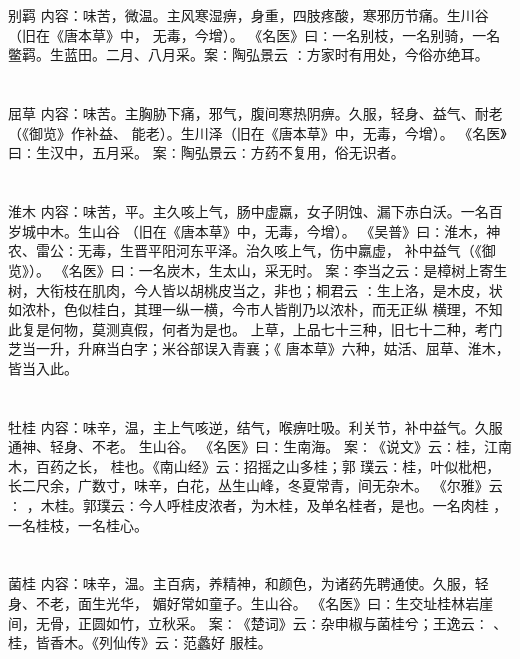 \documentclass[12pt,UTF8]{ctexbook}
\begin{document}
\section{}别羁
内容：味苦，微温。主风寒湿痹，身重，四肢疼酸，寒邪历节痛。生川谷（旧在《唐本草》中， 
无毒，今增）。 
《名医》曰∶一名别枝，一名别骑，一名鳖羁。生蓝田。二月、八月采。案∶陶弘景云 
∶方家时有用处，今俗亦绝耳。 


\section{}屈草
内容：味苦。主胸胁下痛，邪气，腹间寒热阴痹。久服，轻身、益气、耐老（《御览》作补益、 
能老）。生川泽（旧在《唐本草》中，无毒，今增）。 
《名医》曰∶生汉中，五月采。 
案∶陶弘景云∶方药不复用，俗无识者。 


\section{}淮木
内容：味苦，平。主久咳上气，肠中虚羸，女子阴蚀、漏下赤白沃。一名百岁城中木。生山谷 
（旧在《唐本草》中，无毒，今增）。 
《吴普》曰∶淮木，神农、雷公∶无毒，生晋平阳河东平泽。治久咳上气，伤中羸虚， 
补中益气（《御览》）。 
《名医》曰∶一名炭木，生太山，采无时。 
案∶李当之云∶是樟树上寄生树，大衔枝在肌肉，今人皆以胡桃皮当之，非也；桐君云 
∶生上洛，是木皮，状如浓朴，色似桂白，其理一纵一横，今市人皆削乃以浓朴，而无正纵 
横理，不知此复是何物，莫测真假，何者为是也。 
上草，上品七十三种，旧七十二种，考门芝当一升，升麻当白字；米谷部误入青襄；《 
唐本草》六种，姑活、屈草、淮木，皆当入此。 


\section{}牡桂
内容：味辛，温，主上气咳逆，结气，喉痹吐吸。利关节，补中益气。久服通神、轻身、不老。 
生山谷。 
《名医》曰∶生南海。 
案∶《说文》云∶桂，江南木，百药之长， 桂也。《南山经》云∶招摇之山多桂；郭 
璞云∶桂，叶似枇杷，长二尺余，广数寸，味辛，白花，丛生山峰，冬夏常青，间无杂木。 
《尔雅》云∶ ，木桂。郭璞云∶今人呼桂皮浓者，为木桂，及单名桂者，是也。一名肉桂 
，一名桂枝，一名桂心。 


\section{}菌桂
内容：味辛，温。主百病，养精神，和颜色，为诸药先聘通使。久服，轻身、不老，面生光华， 
媚好常如童子。生山谷。 
《名医》曰∶生交址桂林岩崖间，无骨，正圆如竹，立秋采。 
案∶《楚词》云∶杂申椒与菌桂兮；王逸云∶ 、桂，皆香木。《列仙传》云∶范蠡好 
服桂。 
\end{document}

